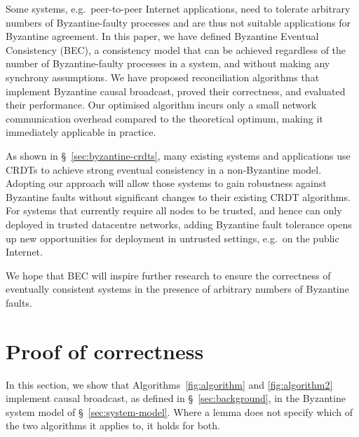 \documentclass[a4paper,anonymous,USenglish]{lipics-v2019}
\begin{document}
Some systems, e.g.\ peer-to-peer Internet applications, need to tolerate arbitrary numbers of Byzantine-faulty processes and are thus not suitable applications for Byzantine agreement.
In this paper, we have defined Byzantine Eventual Consistency (BEC), a consistency model that can be achieved regardless of the number of Byzantine-faulty processes in a system, and without making any synchrony assumptions.
We have proposed reconciliation algorithms that implement Byzantine causal broadcast, proved their correctness, and evaluated their performance.
Our optimised algorithm incurs only a small network communication overhead compared to the theoretical optimum, making it immediately applicable in practice.

As shown in \S~\ref{sec:byzantine-crdts}, many existing systems and applications use CRDTs to achieve strong eventual consistency in a non-Byzantine model.
Adopting our approach will allow those systems to gain robustness against Byzantine faults without significant changes to their existing CRDT algorithms.
For systems that currently require all nodes to be trusted, and hence can only deployed in trusted datacentre networks, adding Byzantine fault tolerance opens up new opportunities for deployment in untrusted settings, e.g.\ on the public Internet.

We hope that BEC will inspire further research to ensure the correctness of eventually consistent systems in the presence of arbitrary numbers of Byzantine faults.



\newpage\appendix

\section{Proof of correctness}\label{sec:proof}

In this section, we show that Algorithms~\ref{fig:algorithm} and \ref{fig:algorithm2} implement causal broadcast, as defined in \S~\ref{sec:background}, in the Byzantine system model of \S~\ref{sec:system-model}.
Where a lemma does not specify which of the two algorithms it applies to, it holds for both.
\end{document}
